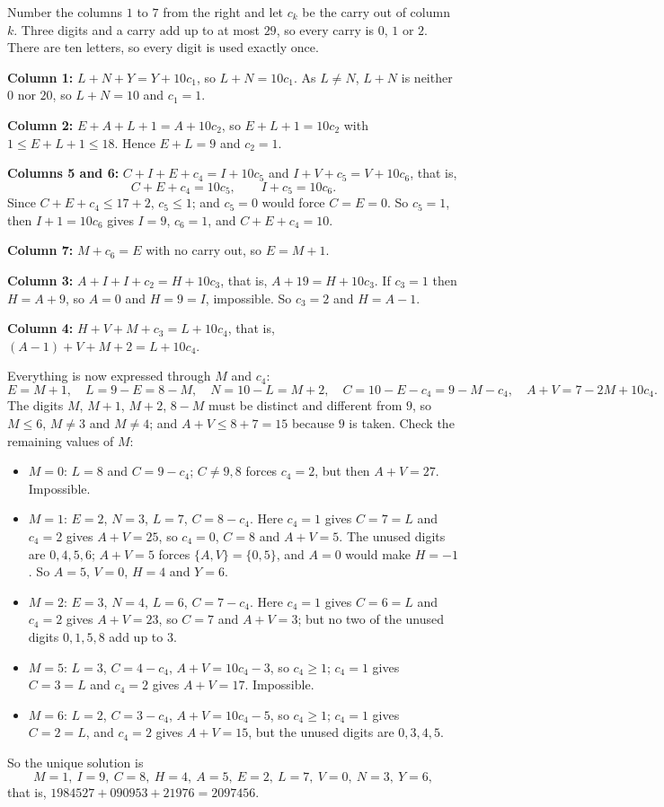 Number the columns $1$ to $7$ from the right and let $c_k$ be the carry out of column $k$. Three digits and a carry add up to at most $29$, so every carry is $0$, $1$ or $2$. There are ten letters, so every digit is used exactly once.

\textbf{Column 1:} $L+N+Y=Y+10c_1$, so $L+N=10c_1$. As $L\ne N$, $L+N$ is neither $0$ nor $20$, so $L+N=10$ and $c_1=1$.

\textbf{Column 2:} $E+A+L+1=A+10c_2$, so $E+L+1=10c_2$ with $1\le E+L+1\le18$. Hence $E+L=9$ and $c_2=1$.

\textbf{Columns 5 and 6:} $C+I+E+c_4=I+10c_5$ and $I+V+c_5=V+10c_6$, that is,
\[C+E+c_4=10c_5,\qquad I+c_5=10c_6 .\]
Since $C+E+c_4\le17+2$, $c_5\le1$; and $c_5=0$ would force $C=E=0$. So $c_5=1$, then $I+1=10c_6$ gives $I=9$, $c_6=1$, and $C+E+c_4=10$.

\textbf{Column 7:} $M+c_6=E$ with no carry out, so $E=M+1$.

\textbf{Column 3:} $A+I+I+c_2=H+10c_3$, that is, $A+19=H+10c_3$. If $c_3=1$ then $H=A+9$, so $A=0$ and $H=9=I$, impossible. So $c_3=2$ and $H=A-1$.

\textbf{Column 4:} $H+V+M+c_3=L+10c_4$, that is, $(A-1)+V+M+2=L+10c_4$.

Everything is now expressed through $M$ and $c_4$:
\[E=M+1,\quad L=9-E=8-M,\quad N=10-L=M+2,\quad C=10-E-c_4=9-M-c_4,\quad A+V=7-2M+10c_4 .\]
The digits $M$, $M+1$, $M+2$, $8-M$ must be distinct and different from $9$, so $M\le6$, $M\ne3$ and $M\ne4$; and $A+V\le8+7=15$ because $9$ is taken. Check the remaining values of $M$:
\begin{itemize}
\item $M=0$: $L=8$ and $C=9-c_4$; $C\ne9,8$ forces $c_4=2$, but then $A+V=27$. Impossible.
\item $M=1$: $E=2$, $N=3$, $L=7$, $C=8-c_4$. Here $c_4=1$ gives $C=7=L$ and $c_4=2$ gives $A+V=25$, so $c_4=0$, $C=8$ and $A+V=5$. The unused digits are $0,4,5,6$; $A+V=5$ forces $\{A,V\}=\{0,5\}$, and $A=0$ would make $H=-1$. So $A=5$, $V=0$, $H=4$ and $Y=6$.
\item $M=2$: $E=3$, $N=4$, $L=6$, $C=7-c_4$. Here $c_4=1$ gives $C=6=L$ and $c_4=2$ gives $A+V=23$, so $C=7$ and $A+V=3$; but no two of the unused digits $0,1,5,8$ add up to $3$.
\item $M=5$: $L=3$, $C=4-c_4$, $A+V=10c_4-3$, so $c_4\ge1$; $c_4=1$ gives $C=3=L$ and $c_4=2$ gives $A+V=17$. Impossible.
\item $M=6$: $L=2$, $C=3-c_4$, $A+V=10c_4-5$, so $c_4\ge1$; $c_4=1$ gives $C=2=L$, and $c_4=2$ gives $A+V=15$, but the unused digits are $0,3,4,5$.
\end{itemize}
So the unique solution is
\[\boxed{M=1,\ I=9,\ C=8,\ H=4,\ A=5,\ E=2,\ L=7,\ V=0,\ N=3,\ Y=6},\]
that is, $1984527+090953+21976=2097456$.
